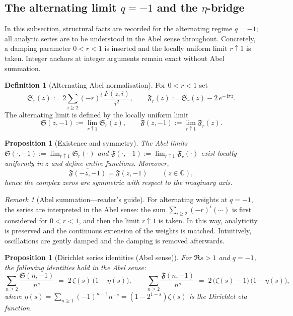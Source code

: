 \documentclass[11pt,a4paper]{amsart}
\newcommand{\C}{\mathbb{C}}
\newcommand{\ii}{\mathrm{i}}
\theoremstyle{plain}
\newtheorem{proposition}[theorem]{Proposition}
\theoremstyle{definition}
\newtheorem{definition}[theorem]{Definition}
\theoremstyle{remark}
\newtheorem{remark}[theorem]{Remark}
\begin{document}
\subsection{The alternating limit \texorpdfstring{$q=-1$}{q=-1} and the \texorpdfstring{$\eta$}{eta}-bridge}
\label{sec:qminus1-eta}

In this subsection, structural facts are recorded for the alternating regime \(q=-1\); all analytic series are to be understood in the Abel sense throughout.
Concretely, a damping parameter \(0<r<1\) is inserted and the locally uniform limit \(r\uparrow1\) is taken.
Integer anchors at integer arguments remain exact without Abel summation.

\begin{definition}[Alternating Abel normalisation]
For \(0<r<1\) set
\[
\mathfrak S_r(z):=2\sum_{i\ge2}(-r)^{i}\,\frac{F(z,i)}{i^2},
\qquad
\mathfrak F_r(z):=\mathfrak S_r(z)-2\,e^{-\,\ii\pi z}.
\]
The alternating limit is defined by the locally uniform limit
\[
\mathfrak S(z,-1):=\lim_{r\uparrow1}\mathfrak S_r(z),\qquad
\mathfrak F(z,-1):=\lim_{r\uparrow1}\mathfrak F_r(z).
\]
\end{definition}

\begin{proposition}[Existence and symmetry]\label{prop:qminus1-entire-sym}
The Abel limits \(\mathfrak S(\cdot,-1):=\lim_{r\uparrow1}\mathfrak S_r(\cdot)\) and \(\mathfrak F(\cdot,-1):=\lim_{r\uparrow1}\mathfrak F_r(\cdot)\) exist \emph{locally uniformly} in $z$ and define entire functions.
Moreover,
\[
\overline{\mathfrak F(-\overline{z},-1)}=\mathfrak F(z,-1)\qquad(z\in\C),
\]
hence the complex zeros are symmetric with respect to the imaginary axis.
\end{proposition}

\begin{remark}[Abel summation—reader’s guide]
For alternating weights at \(q=-1\), the series are interpreted in the Abel sense: the sum \(\sum_{i\ge2}(-r)^i(\cdots)\) is first considered for \(0<r<1\), and then the limit \(r\uparrow1\) is taken. In this way, analyticity is preserved and the continuous extension of the weights is matched. Intuitively, oscillations are gently damped and the damping is removed afterwards.
\end{remark}

\begin{proposition}[Dirichlet series identities (Abel sense)]\label{prop:qminus1-dirichlet}
For $\Re s>1$ and $q=-1$, the following identities hold \emph{in the Abel sense}:
\[
\sum_{n\ge2}\frac{\mathfrak S(n,-1)}{n^s}
\;=\;2\,\zeta(s)\,\bigl(1-\eta(s)\bigr),
\qquad
\sum_{n\ge2}\frac{\mathfrak F(n,-1)}{n^s}
\;=\;2\,\bigl(\zeta(s)-1\bigr)\,\bigl(1-\eta(s)\bigr),
\]
where $\eta(s)=\sum_{n\ge1}(-1)^{n-1}n^{-s}=(1-2^{1-s})\zeta(s)$ is the Dirichlet eta function.
\end{proposition}
\end{document}
